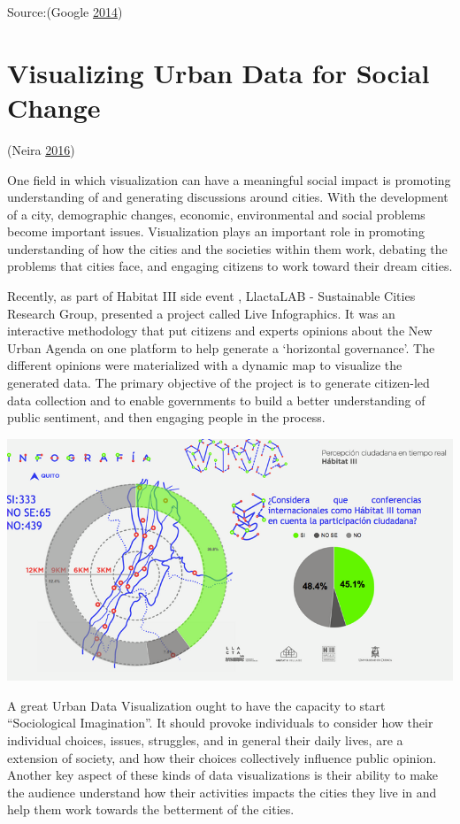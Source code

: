 \documentclass[]{book}
\begin{document}
Source:(Google \protect\hyperlink{ref-google_music}{2014})

\hypertarget{visualizing-urban-data-for-social-change}{%
\section{Visualizing Urban Data for Social Change}\label{visualizing-urban-data-for-social-change}}

(Neira \protect\hyperlink{ref-Socialchange}{2016})

One field in which visualization can have a meaningful social impact is promoting understanding of and generating discussions around cities. With the development of a city, demographic changes, economic, environmental and social problems become important issues. Visualization plays an important role in promoting understanding of how the cities and the societies within them work, debating the problems that cities face, and engaging citizens to work toward their dream cities.

Recently, as part of Habitat III side event , LlactaLAB - Sustainable Cities Research Group, presented a project called Live Infographics. It was an interactive methodology that put citizens and experts opinions about the New Urban Agenda on one platform to help generate a `horizontal governance'. The different opinions were materialized with a dynamic map to visualize the generated data. The primary objective of the project is to generate citizen-led data collection and to enable governments to build a better understanding of public sentiment, and then engaging people in the process.

\includegraphics{images/Habitat_Village.png}

A great Urban Data Visualization ought to have the capacity to start ``Sociological Imagination''. It should provoke individuals to consider how their individual choices, issues, struggles, and in general their daily lives, are a extension of society, and how their choices collectively influence public opinion. Another key aspect of these kinds of data visualizations is their ability to make the audience understand how their activities impacts the cities they live in and help them work towards the betterment of the cities.
\end{document}
